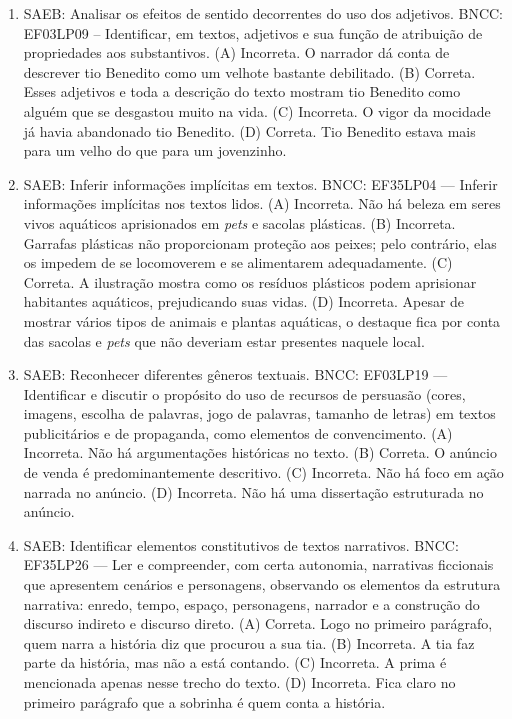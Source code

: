 \begin{enumerate}
\item
SAEB: Analisar os efeitos de sentido decorrentes do uso dos adjetivos.
BNCC: EF03LP09 -- Identificar, em textos, adjetivos e sua função de atribuição de propriedades
aos substantivos.
(A) Incorreta. O narrador dá conta de descrever tio Benedito como um velhote bastante debilitado.
(B) Correta. Esses adjetivos e toda a descrição do texto mostram tio Benedito como alguém que se desgastou muito na vida.
(C) Incorreta. O vigor da mocidade já havia abandonado tio Benedito.
(D) Correta. Tio Benedito estava mais para um velho do que para um jovenzinho.

\item
SAEB: Inferir informações implícitas em textos. 
BNCC: EF35LP04 --- Inferir informações implícitas nos textos lidos. 
(A) Incorreta. Não há beleza em seres vivos aquáticos aprisionados em \emph{pets} e sacolas plásticas. 
(B) Incorreta. Garrafas plásticas não proporcionam proteção aos peixes; pelo contrário, elas os impedem de se locomoverem e se alimentarem adequadamente. 
(C) Correta. A ilustração mostra como os resíduos plásticos podem aprisionar habitantes aquáticos, prejudicando suas vidas. 
(D) Incorreta. Apesar de mostrar vários tipos de animais e plantas aquáticas, o destaque fica por conta das sacolas e \emph{pets} que não deveriam estar presentes naquele local.

\item
SAEB: Reconhecer diferentes gêneros textuais. 
BNCC: EF03LP19 --- Identificar e discutir o propósito do uso de recursos de persuasão (cores, imagens, escolha de palavras, jogo de palavras, tamanho de letras) em textos publicitários e de propaganda, como elementos de convencimento. 
(A) Incorreta. Não há argumentações históricas no texto. 
(B) Correta. O anúncio de venda é predominantemente descritivo. 
(C) Incorreta. Não há foco em ação narrada no anúncio. 
(D) Incorreta. Não há uma dissertação estruturada no anúncio.

\item
SAEB: Identificar elementos constitutivos de textos narrativos. 
BNCC: EF35LP26 --- Ler e compreender, com certa autonomia, narrativas ficcionais que apresentem cenários e personagens, observando os elementos da estrutura narrativa: enredo, tempo, espaço, personagens, narrador e a construção do discurso indireto e discurso direto. 
(A) Correta. Logo no primeiro parágrafo, quem narra a história diz que procurou a sua tia. 
(B) Incorreta. A tia faz parte da história, mas não a está contando. 
(C) Incorreta. A prima é mencionada apenas nesse trecho do texto. 
(D) Incorreta. Fica claro no primeiro parágrafo que a sobrinha é quem conta a história.


\end{enumerate}
